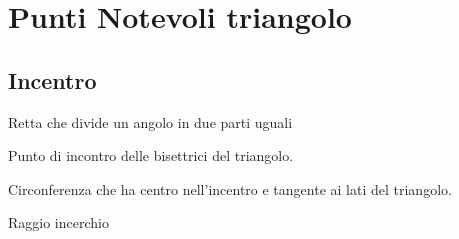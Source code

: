 \section{Punti Notevoli triangolo}
\subsection{Incentro}
\begin{defn}[Bisettrice]
Retta che divide un angolo in due parti uguali
\end{defn}
\begin{defn}[Incentro]
Punto di incontro delle bisettrici del triangolo.
\end{defn}
\begin{defn}[Incerchio]
Circonferenza che ha centro nell'incentro e tangente ai lati del triangolo.
\end{defn}
{\centering
	
	\par}
\begin{defn}[Inraggio]
	Raggio incerchio
\end{defn}
{\centering
	
	\par}
